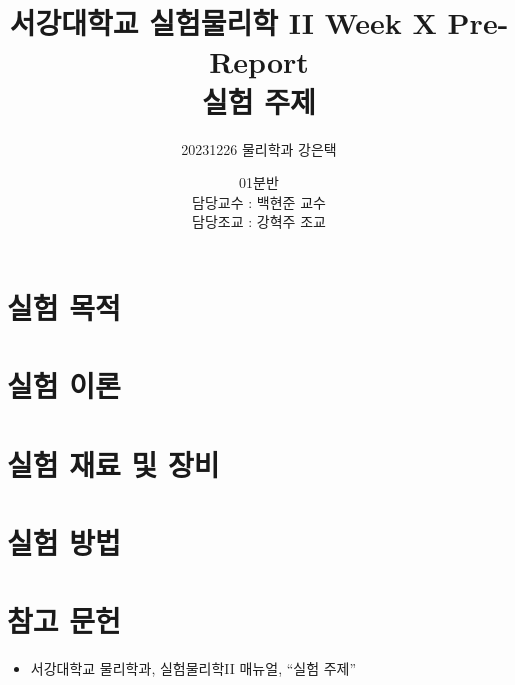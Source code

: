 \documentclass{oblivoir}
\title{\textbf{서강대학교 실험물리학 II Week X Pre-Report\\ 실험 주제}}
\author{20231226 물리학과 강은택}
\date{01분반\\담당교수 : 백현준 교수 \\담당조교 : 강혁주 조교}
\begin{document}
\maketitle
\tableofcontents
\newpage

\section{실험 목적}

\section{실험 이론}



\section{실험 재료 및 장비}


\section{실험 방법}

\newpage

\section{참고 문헌}
\begin{itemize}
\item 서강대학교 물리학과, 실험물리학II 매뉴얼, ``실험 주제''
\end{itemize}
\end{document}
